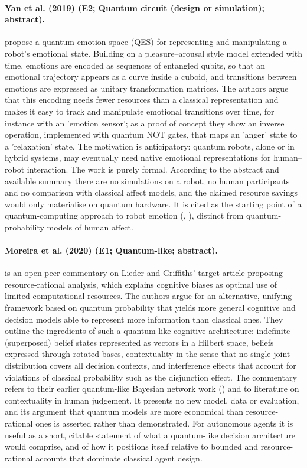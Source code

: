 \documentclass[10pt,a4paper]{article}
\begin{document}
\paragraph{Yan et al. (2019) (E2; Quantum circuit (design or simulation); abstract).} \citet{Yan2019} propose a quantum emotion space (QES) for representing and manipulating a robot's emotional state. Building on a pleasure--arousal style model extended with time, emotions are encoded as sequences of entangled qubits, so that an emotional trajectory appears as a curve inside a cuboid, and transitions between emotions are expressed as unitary transformation matrices. The authors argue that this encoding needs fewer resources than a classical representation and makes it easy to track and manipulate emotional transitions over time, for instance with an 'emotion sensor'; as a proof of concept they show an inverse operation, implemented with quantum NOT gates, that maps an 'anger' state to a 'relaxation' state. The motivation is anticipatory: quantum robots, alone or in hybrid systems, may eventually need native emotional representations for human--robot interaction. The work is purely formal. According to the abstract and available summary there are no simulations on a robot, no human participants and no comparison with classical affect models, and the claimed resource savings would only materialise on quantum hardware. It is cited as the starting point of a quantum-computing approach to robot emotion (\citep{Yan2021b}, \citep{Yan2021c}), distinct from quantum-probability models of human affect.

\paragraph{Moreira et al. (2020) (E1; Quantum-like; abstract).} \citet{Moreira2020a} is an open peer commentary on Lieder and Griffiths' target article proposing resource-rational analysis, which explains cognitive biases as optimal use of limited computational resources. The authors argue for an alternative, unifying framework based on quantum probability that yields more general cognitive and decision models able to represent more information than classical ones. They outline the ingredients of such a quantum-like cognitive architecture: indefinite (superposed) belief states represented as vectors in a Hilbert space, beliefs expressed through rotated bases, contextuality in the sense that no single joint distribution covers all decision contexts, and interference effects that account for violations of classical probability such as the disjunction effect. The commentary refers to their earlier quantum-like Bayesian network work (\citep{Moreira2016}) and to literature on contextuality in human judgement. It presents no new model, data or evaluation, and its argument that quantum models are more economical than resource-rational ones is asserted rather than demonstrated. For autonomous agents it is useful as a short, citable statement of what a quantum-like decision architecture would comprise, and of how it positions itself relative to bounded and resource-rational accounts that dominate classical agent design.
\end{document}
